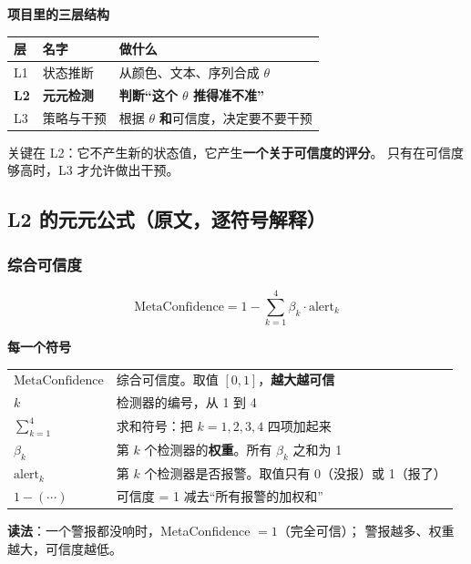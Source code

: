 \documentclass[UTF8,a4paper,11pt]{ctexart}
\newenvironment{explainbox}[1]
{\begin{center}\begin{minipage}{0.94\textwidth}\colorbox{boxbg}{\parbox{0.92\textwidth}{\textbf{#1}\par\vspace{2pt}}}}
{\end{minipage}\end{center}}
\begin{document}
\begin{explainbox}{项目里的三层结构}
\begin{center}
\begin{tabular}{p{1.4cm}p{3.4cm}p{8.8cm}}
\toprule
\textbf{层} & \textbf{名字} & \textbf{做什么} \\
\midrule
L1 & 状态推断 & 从颜色、文本、序列合成 $\theta$ \\
\textbf{L2} & \textbf{元元检测} & \textbf{判断“这个 $\theta$ 推得准不准”} \\
L3 & 策略与干预 & 根据 $\theta$ \textbf{和}可信度，决定要不要干预 \\
\bottomrule
\end{tabular}
\end{center}
关键在 L2：它不产生新的状态值，它产生\textbf{一个关于可信度的评分}。
只有在可信度够高时，L3 才允许做出干预。
\end{explainbox}

\subsection{L2 的元元公式（原文，逐符号解释）}

\subsubsection{综合可信度}

\begin{equation}
\text{MetaConfidence} = 1 - \sum_{k=1}^{4} \beta_k \cdot \text{alert}_k
\label{p3:eq:mc-l2}
\end{equation}

\begin{explainbox}{每一个符号}
\begin{longtable}{@{}p{3.2cm}p{10.6cm}@{}}
$\text{MetaConfidence}$ & 综合可信度。取值 $[0,1]$，\textbf{越大越可信} \\
$k$ & 检测器的编号，从 1 到 4 \\
$\sum_{k=1}^{4}$ & 求和符号：把 $k=1,2,3,4$ 四项加起来 \\
$\beta_k$ & 第 $k$ 个检测器的\textbf{权重}。所有 $\beta_k$ 之和为 1 \\
$\text{alert}_k$ & 第 $k$ 个检测器是否报警。取值只有 0（没报）或 1（报了） \\
$1 - (\cdots)$ & 可信度 = 1 减去“所有报警的加权和” \\
\end{longtable}
\textbf{读法}：一个警报都没响时，MetaConfidence $= 1$（完全可信）；
警报越多、权重越大，可信度越低。
\end{explainbox}
\end{document}
